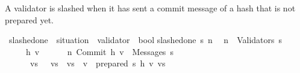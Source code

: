 \documentclass{beamer}
\begin{document}
\begin{frame}
\begin{isamarkuptext}%
[i] A validator is slashed when it has sent a commit message of a hash
      that is not prepared yet.%
\end{isamarkuptext}\isamarkuptrue%
\isamarkupfalse%
\ slashed{\isacharunderscore}one\ {\isacharcolon}{\isacharcolon}\ {\isachardoublequoteopen}situation\ {\isasymRightarrow}\ validator\ {\isasymRightarrow}\ bool{\isachardoublequoteclose}\isanewline
{}\isanewline
{\isachardoublequoteopen}slashed{\isacharunderscore}one\ s\ n\ {\isacharequal}\isanewline
\ {\isacharparenleft}n\ {\isasymin}\ Validators\ s\ {\isasymand}\isanewline
\ \ \ \ {\isacharparenleft}{\isasymexists}\ h\ v{\isachardot}\isanewline
\ \ \ \ \ \ {\isacharparenleft}{\isacharparenleft}n{\isacharcomma}\ Commit\ {\isacharparenleft}h{\isacharcomma}\ v{\isacharparenright}{\isacharparenright}\ {\isasymin}\ Messages\ s\ {\isasymand}\isanewline
\ \ \ \ {\isacharparenleft}{\isasymnot}\ {\isacharparenleft}{\isasymexists}\ vs{\isachardot}\ {\isacharminus}{}\ {\isasymle}\ vs\ {\isasymand}\ vs\ {\isacharless}\ v\ {\isasymand}\ prepared\ s\ h\ v\ vs{\isacharparenright}\ {\isacharparenright}{\isacharparenright}{\isacharparenright}{\isacharparenright}{\isachardoublequoteclose}%
\end{frame}
\end{document}
